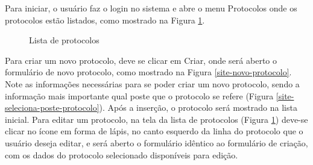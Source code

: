 \documentclass[
	article,			%
	11pt,				%
	oneside,			%
	a4paper,			%
	english,			%
	brazil,				%
	sumario=tradicional
	]{abntex2}
\begin{document}
Para iniciar, o usuário faz o login no sistema e abre o menu Protocolos onde os protocolos estão listados, como mostrado na Figura \ref{site-tela-inicial}.

\begin{figure}[!htbp]
 \centering
 \caption{\label{site-tela-inicial}Lista de protocolos}
\end{figure}

\clearpage

Para criar um novo protocolo, deve se clicar em Criar, onde será aberto o formulário de novo protocolo, como mostrado na Figura \ref{site-novo-protocolo}.
Note as informações necessárias para se poder criar um novo protocolo, sendo a informação mais importante qual poste que o protocolo se refere (Figura \ref{site-seleciona-poste-protocolo}).
Após a inserção, o protocolo será mostrado na lista inicial.
Para editar um protocolo, na tela da lista de protocolos (Figura \ref{site-tela-inicial}) deve-se clicar no ícone em forma de lápis, no canto esquerdo da linha do protocolo que o usuário deseja editar, e será aberto o formulário idêntico ao formulário de criação, com os dados do protocolo selecionado disponíveis para edição.
\end{document}
